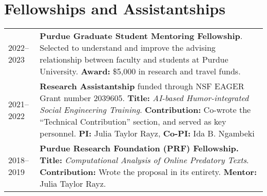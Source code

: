 \documentclass[11pt]{article}
\begin{document}
\section*{Fellowships and Assistantships}
\vspace{-.5em}
\renewcommand*{\arraystretch}{1.5}
\begin{tabularx}{\textwidth}{@{}p{} X}
2022--2023 & \textbf{Purdue Graduate Student Mentoring Fellowship}. Selected to understand and improve the advising relationship between faculty and students at Purdue University. \textbf{Award:} \$5{,}000 in research and travel funds.\\
2021--2022 & \textbf{Research Assistantship} funded through NSF EAGER Grant number 2039605. \textbf{Title:} \emph{AI-based Humor-integrated Social Engineering Training}. \textbf{Contribution:} Co-wrote the ``Technical Contribution'' section, and served as key personnel. \textbf{PI:} Julia Taylor Rayz, \textbf{Co-PI:} Ida B. Ngambeki \\
2018--2019 & \textbf{Purdue Research Foundation (PRF) Fellowship.} \textbf{Title:} \textit{Computational Analysis of Online Predatory Texts}. \textbf{Contribution:} Wrote the proposal in its entirety. \textbf{Mentor:} Julia Taylor Rayz.\\
\end{tabularx}

\renewcommand*{\arraystretch}{1}
\end{document}
